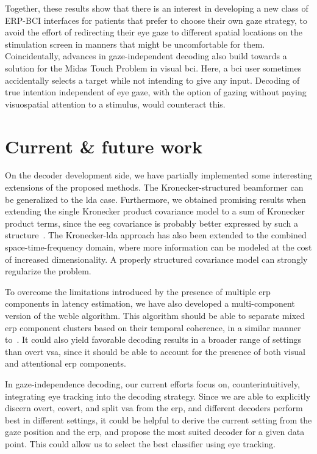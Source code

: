 Together, these results show that there is an interest in developing a new class of ERP-BCI
interfaces for patients that prefer to choose their own gaze strategy, to
avoid the effort of redirecting their eye gaze to different spatial locations
on the stimulation screen in manners that might be uncomfortable for them.
Coincidentally, advances in gaze-independent decoding also build towards a
solution for the Midas Touch Problem in visual \ac{bci}.
Here, a \ac{bci} user sometimes accidentally selects a target while not intending
to give any input.
Decoding of true intention independent of eye
gaze, with the option of gazing without paying visuospatial attention to a
stimulus, would counteract this.

\section{Current \& future work}
On the decoder development side, we have partially implemented some interesting
extensions of the proposed methods.
The Kronecker-structured beamformer can be generalized to the \ac{lda} case.
Furthermore, we obtained promising results when extending the single
Kronecker product covariance model to a sum of Kronecker product terms, since
the \ac{eeg} covariance is probably better expressed by such a
structure~\cite{Bijma2005}.
The Kronecker-\ac{lda} approach has also been extended to the combined
space-time-frequency domain, where more information can be modeled at the cost
of increased dimensionality.
A properly structured covariance model can strongly regularize the problem.

To overcome the limitations introduced by the presence of multiple \ac{erp}
components in latency estimation, we have also developed a multi-component
version of the \ac{wcble} algorithm.
This algorithm should be able to separate mixed \ac{erp} component clusters
based on their temporal coherence, in a similar manner to~\textcite{Ouyang2017}.
It could also yield favorable decoding results in a broader range of settings
than overt \ac{vsa}, since it should be able to account for the presence of both
visual and attentional \ac{erp} components.

In gaze-independence decoding, our current efforts focus on,
counterintuitively, integrating eye tracking into the decoding strategy.
Since we are able to explicitly discern overt, covert, and split \ac{vsa} from
the \ac{erp}, and different decoders perform best in different settings, it
could be helpful to derive the current setting from the gaze position and the
\ac{erp}, and propose the most suited decoder for a given data point.
This could allow us to select the best classifier using eye tracking.

